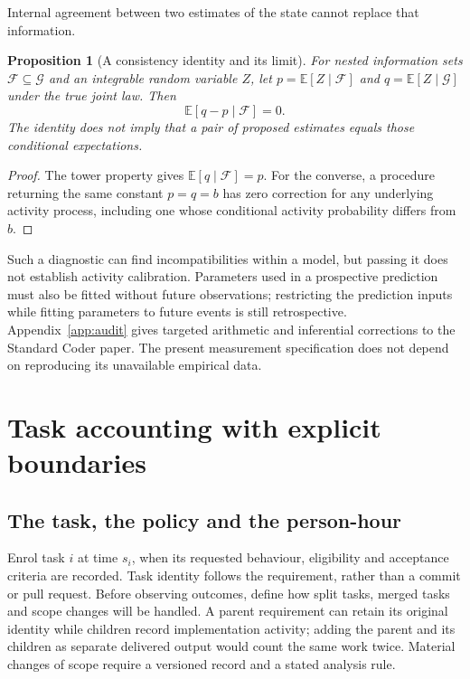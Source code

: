 \documentclass[11pt,a4paper]{amsart}
\newtheorem{proposition}{Proposition}[section]
\theoremstyle{definition}
\theoremstyle{remark}
\newcommand{\E}{\mathbb E}
\begin{document}
Internal agreement between two estimates of the state cannot replace that information.

\begin{proposition}[A consistency identity and its limit]
\label{prop:consistency}
For nested information sets $\mathcal F\subseteq\mathcal G$ and an integrable random variable $Z$, let $p=\E[Z\mid\mathcal F]$ and $q=\E[Z\mid\mathcal G]$ under the true joint law. Then
\begin{equation}
\label{eq:tower}
 \E[q-p\mid\mathcal F]=0.
\end{equation}
The identity does not imply that a pair of proposed estimates equals those conditional expectations.
\end{proposition}

\begin{proof}
The tower property gives $\E[q\mid\mathcal F]=p$. For the converse, a procedure returning the same constant $p=q=b$ has zero correction for any underlying activity process, including one whose conditional activity probability differs from $b$.
\end{proof}

Such a diagnostic can find incompatibilities within a model, but passing it does not establish activity calibration. Parameters used in a prospective prediction must also be fitted without future observations; restricting the prediction inputs while fitting parameters to future events is still retrospective. Appendix~\ref{app:audit} gives targeted arithmetic and inferential corrections to the Standard Coder paper. The present measurement specification does not depend on reproducing its unavailable empirical data.

\section{Task accounting with explicit boundaries}
\label{sec:accounting}

\subsection{The task, the policy and the person-hour}

Enrol task $i$ at time $s_i$, when its requested behaviour, eligibility and acceptance criteria are recorded. Task identity follows the requirement, rather than a commit or pull request. Before observing outcomes, define how split tasks, merged tasks and scope changes will be handled. A parent requirement can retain its original identity while children record implementation activity; adding the parent and its children as separate delivered output would count the same work twice. Material changes of scope require a versioned record and a stated analysis rule.
\end{document}
